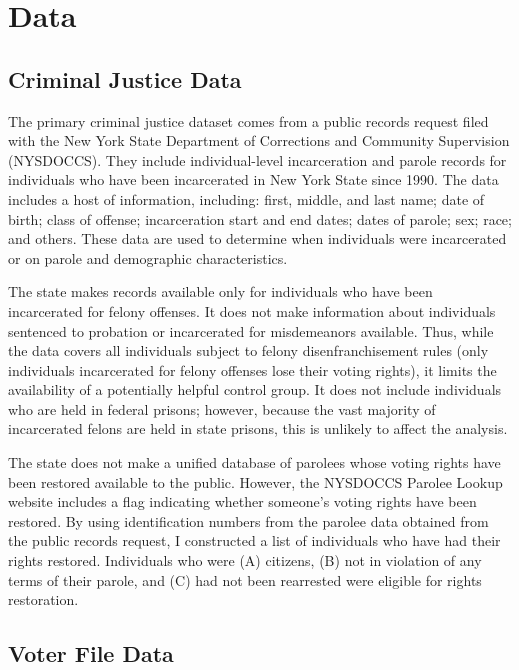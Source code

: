 \documentclass[
  12pt,
]{article}
\begin{document}
\hypertarget{data}{%
\section{Data}\label{data}}

\hypertarget{criminal-justice-data}{%
\subsection*{Criminal Justice Data}\label{criminal-justice-data}}

The primary criminal justice dataset comes from a public records request filed with the New York State Department of Corrections and Community Supervision (NYSDOCCS). They include individual-level incarceration and parole records for individuals who have been incarcerated in New York State since 1990. The data includes a host of information, including: first, middle, and last name; date of birth; class of offense; incarceration start and end dates; dates of parole; sex; race; and others. These data are used to determine when individuals were incarcerated or on parole and demographic characteristics.

The state makes records available only for individuals who have been incarcerated for felony offenses. It does not make information about individuals sentenced to probation or incarcerated for misdemeanors available. Thus, while the data covers all individuals subject to felony disenfranchisement rules (only individuals incarcerated for felony offenses lose their voting rights), it limits the availability of a potentially helpful control group. It does not include individuals who are held in federal prisons; however, because the vast majority of incarcerated felons are held in state prisons, this is unlikely to affect the analysis.

The state does not make a unified database of parolees whose voting rights have been restored available to the public. However, the NYSDOCCS Parolee Lookup website includes a flag indicating whether someone's voting rights have been restored. By using identification numbers from the parolee data obtained from the public records request, I constructed a list of individuals who have had their rights restored. Individuals who were (A) citizens, (B) not in violation of any terms of their parole, and (C) had not been rearrested were eligible for rights restoration.

\hypertarget{voter-file-data}{%
\subsection*{Voter File Data}\label{voter-file-data}}
\end{document}
